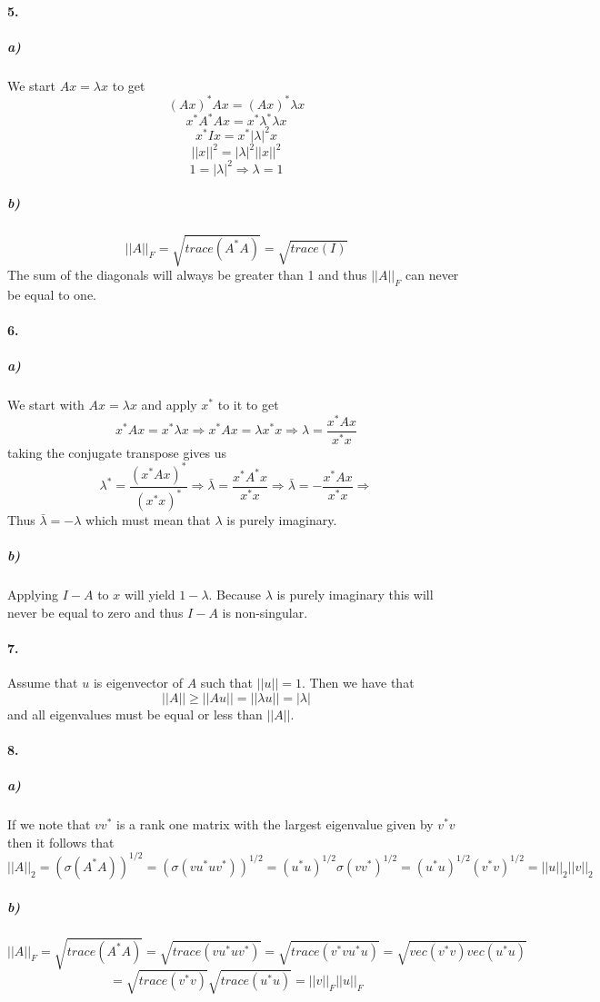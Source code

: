 \documentclass[12pt]{article}
\begin{document}
\paragraph{5.}
	\subparagraph{a)}
		We start $Ax = \lambda x$ to get
		\[ (Ax)^*Ax = (Ax)^*\lambda x \]
		\[ x^*A^*Ax = x^*\lambda^*\lambda x \]
		\[ x^*Ix = x^*|\lambda|^2 x \]
		\[ ||x||^2 = |\lambda|^2 ||x||^2 \]
		\[ 1 = |\lambda|^2 \Rightarrow \lambda = 1\] 
		
	\subparagraph{b)}
		\[
		||A||_F = \sqrt{trace(A^*A)} = \sqrt{trace(I)}
		\]
		The sum of the diagonals will always be greater than 1 and thus $||A||_F$ can never be equal to one.

\paragraph{6.}
	\subparagraph{a)}
		We start with $Ax = \lambda x$ and apply $x^*$ to it to get
		\[
		x^*Ax = x^*\lambda x \Rightarrow
		x^*Ax = \lambda x^*x \Rightarrow
		\lambda = \frac{x^*Ax}{x^*x}
		\]
		taking the conjugate transpose gives us
		\[
		\lambda^* = \frac{(x^*Ax)^*}{(x^*x)^*} \Rightarrow
		\bar{\lambda} = \frac{x^*A^*x}{x^*x} \Rightarrow
		\bar{\lambda} = -\frac{x^*Ax}{x^*x} \Rightarrow
		\]
		Thus $\bar{\lambda} = -\lambda$ which must mean that $\lambda$ is purely imaginary.
		
	\subparagraph{b)}
		Applying $I - A$ to $x$ will yield $1 - \lambda$. Because $\lambda$ is purely imaginary this will never be equal to zero and thus $I - A$ is non-singular.
	

\paragraph{7.}
	Assume that $u$ is eigenvector of $A$ such that $||u|| = 1$. Then we have that
	\[
	||A|| \ge ||Au|| = ||\lambda u|| = |\lambda|
	\]
	and all eigenvalues must be equal or less than $||A||$.

\paragraph{8.}
	\subparagraph{a)}
		If we note that $vv^*$ is a rank one matrix with the largest eigenvalue given by $v^*v$ then it follows that
		\[
		||A||_2 = (\sigma(A^*A))^{1/2} = (\sigma(vu^*uv^*))^{1/2} = (u^*u)^{1/2}\sigma(vv^*)^{1/2} = (u^*u)^{1/2}(v^*v)^{1/2} = ||u||_2 ||v||_2
		\]
	
	\subparagraph{b)}
	\[
	||A||_F = \sqrt{trace(A^*A)} = \sqrt{trace(vu^*uv^*)} = \sqrt{trace(v^*vu^*u)} = \sqrt{vec(v^*v)vec(u^*u)}
	\]
	\[
	= \sqrt{trace(v^*v)}\sqrt{trace(u^*u)} = ||v||_F ||u||_F
	\]
\end{document}
